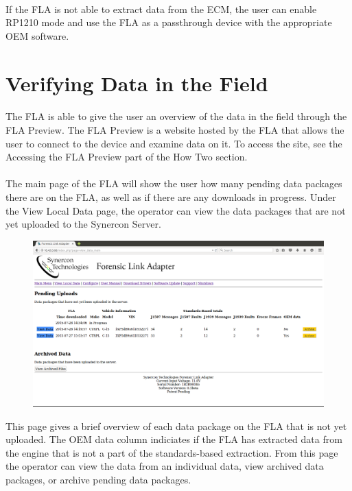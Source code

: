 \documentclass[11pt]{article}
\begin{document}
\paragraph{  }
If the FLA is not able to extract data from the ECM, the user can enable RP1210 mode and use the FLA as a passthrough device with the appropriate OEM software.

\section{Verifying Data in the Field}
\paragraph{  }
The FLA is able to give the user an overview of the data in the field through the FLA Preview. The FLA Preview is a website hosted by the FLA that allows the user to connect to the device and examine data on it. To access the site, see the Accessing the FLA Preview part of the How Two section.
\paragraph{}
The main page of the FLA will show the user how many pending data packages there are on the FLA, as well as if there are any downloads in progress. Under the View Local Data page, the operator can view the data packages that are not yet uploaded to the Synercon Server.
\begin{figure}[tbph]
\centering
\includegraphics[width=1\linewidth]{./fla_site/local_data}
\label{fig:fla_preview_local_data}
\caption{}
\end{figure}
This page gives a brief overview of each data package on the FLA that is not yet uploaded. The OEM data column indiciates if the FLA has extracted data from the engine that is not a part of the standards-based extraction. From this page the operator can view the data from an individual data, view archived data packages, or archive pending data packages.
\end{document}
